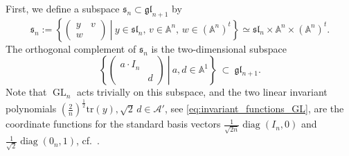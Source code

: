 \documentclass[reqno, 11pt]{amsart} %
\numberwithin{equation}{section}
\theoremstyle{plain}
\theoremstyle{definition}
\theoremstyle{remark}
\newcommand{\tr}{\mathrm{tr}}
\newcommand{\diag}{\operatorname{diag}}
\newcommand{\mbA}{\mathbb{A}}
\newcommand{\mcA}{\mathcal{A}}
\newcommand{\mfg}{\mathfrak{g}}
\newcommand{\mfl}{\mathfrak{l}}
\newcommand{\mfs}{\mathfrak{s}}
\newcommand{\mfgl}{\mfg\mfl}
\newcommand{\mfsl}{\mfs\mfl}
\newcommand{\lie}[1]{ \mathfrak{#1}}
\DeclareMathOperator{\GL}{GL}
\begin{document}
First, we define a subspace $\lie s_n \subset \lie{gl}_{n+1}$ by
\begin{equation}\label{eq:intro_sl_setting}
\lie s_n :=  \left\{\left. \begin{pmatrix}
y & v \\ w &
\end{pmatrix}\ \right\vert\ y \in \lie{sl}_n, \, v \in \mbA^n , \, w \in  (\mbA^n)^t \right\} \simeq 	\mfsl_n \times \mbA^n \times (\mbA^n)^t .
\end{equation}
The orthogonal complement of $\lie s_n$ is the two-dimensional subspace
\begin{equation}\label{eq:trivial_two_dim_sub}
\left.\left\{\begin{pmatrix}
a \cdot I_n & \\ & d
\end{pmatrix}\ \right\vert\ a,d\in \mbA^1 \right\}\ \subset\ \mfgl_{n+1}.
\end{equation}
Note that $\GL_n$ acts trivially on this subspace, and the two linear invariant polynomials $(\frac{2}{n})^{\frac{1}2}\tr(y), \sqrt 2\,  d\in \mcA'$, see \eqref{eq:invariant_functions_GL}, are the coordinate functions for the standard basis vectors $\frac{1}{\sqrt{2n}}\diag(I_n, 0)$ and $ \frac{1}{\sqrt 2}\diag(0_n,1)$, cf.\ .
\end{document}

